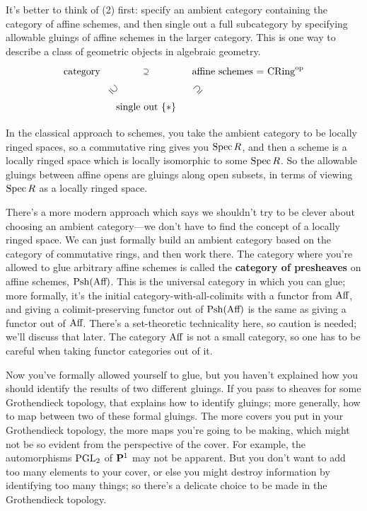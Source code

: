 It's better to think of (2) first: specify an ambient category containing the category of affine schemes, and then single out a full subcategory by specifying allowable gluings of affine schemes in the larger category. This is one way to describe a class of geometric objects in algebraic geometry.
\[\xymatrix@R=2em@C=1em{
\text{category} \ar@{}[rr]|-{\supseteq} \ar@{}[dr]|-{\rotatebox{-45}{$\supseteq$}} && \text{affine schemes = $\text{CRing}^\op$}\\
& \text{single out $\{*\}$} \ar@{}[ur]|-{\rotatebox{45}{$\supseteq$}}
}\]

In the classical approach to schemes, you take the ambient category to be locally ringed spaces, so a commutative ring gives you $\Spec R$, and then a scheme is a locally ringed space which is locally isomorphic to some $\Spec R$. So the allowable gluings between affine opens are gluings along open subsets, in terms of viewing $\Spec R$ as a locally ringed space.

There's a more modern approach which says we shouldn't try to be clever about choosing an ambient category---we don't have to find the concept of a locally ringed space. We can just formally build an ambient category based on the category of commutative rings, and then work there. The category where you're allowed to glue arbitrary affine schemes is called the \textbf{category of presheaves} on affine schemes, $\Psh(\Aff)$. This is the universal category in which you can glue; more formally, it's the initial category-with-all-colimits with a functor from $\Aff$, and giving a colimit-preserving functor out of $\Psh(\Aff)$ is the same as giving a functor out of $\Aff$. There's a set-theoretic technicality here, so caution is needed; we'll discuss that later. The category $\Aff$ is not a small category, so one has to be careful when taking functor categories out of it.

Now you've formally allowed yourself to glue, but you haven't explained how you should identify the results of two different gluings. If you pass to sheaves for some Grothendieck topology, that explains how to identify gluings; more generally, how to map between two of these formal gluings. The more covers you put in your Grothendieck topology, the more maps you're going to be making, which might not be so evident from the perspective of the cover. For example, the automorphisms $\PGL_2$ of $\P^1$ may not be apparent. But you don't want to add too many elements to your cover, or else you might destroy information by identifying too many things; so there's a delicate choice to be made in the Grothendieck topology.

